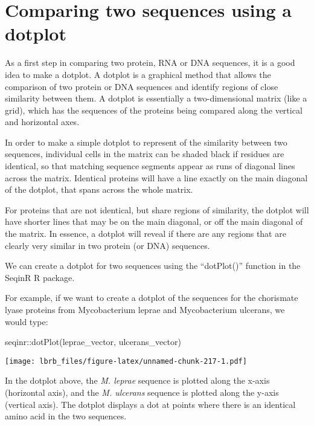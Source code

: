 \documentclass[
]{book}
\newenvironment{Shaded}{\begin{snugshade}}{\end{snugshade}}
\newcommand{\FunctionTok}[1]{\textcolor[rgb]{0.00,0.00,0.00}{#1}}
\newcommand{\NormalTok}[1]{#1}
\newcommand{\SpecialCharTok}[1]{\textcolor[rgb]{0.00,0.00,0.00}{#1}}
\begin{document}
\hypertarget{comparing-two-sequences-using-a-dotplot}{%
\section{Comparing two sequences using a dotplot}\label{comparing-two-sequences-using-a-dotplot}}

As a first step in comparing two protein, RNA or DNA sequences, it is a good idea to make a dotplot. A dotplot is a graphical method that allows the comparison of two protein or DNA sequences and identify regions of close similarity between them. A dotplot is essentially a two-dimensional matrix (like a grid), which has the sequences of the proteins being compared along the vertical and horizontal axes.

In order to make a simple dotplot to represent of the similarity between two sequences, individual cells in the matrix can be shaded black if residues are identical, so that matching sequence segments appear as runs of diagonal lines across the matrix. Identical proteins will have a line exactly on the main diagonal of the dotplot, that spans across the whole matrix.

For proteins that are not identical, but share regions of similarity, the dotplot will have shorter lines that may be on the main diagonal, or off the main diagonal of the matrix. In essence, a dotplot will reveal if there are any regions that are clearly very similar in two protein (or DNA) sequences.

We can create a dotplot for two sequences using the ``dotPlot()'' function in the SeqinR R package.

For example, if we want to create a dotplot of the sequences for the chorismate lyase proteins from Mycobacterium leprae and Mycobacterium ulcerans, we would type:

\begin{Shaded}
\begin{Highlighting}[]
\NormalTok{seqinr}\SpecialCharTok{::}\FunctionTok{dotPlot}\NormalTok{(leprae\_vector, ulcerans\_vector)}
\end{Highlighting}
\end{Shaded}

\texttt{[image: lbrb\_files/figure-latex/unnamed-chunk-217-1.pdf]}

In the dotplot above, the \emph{M. leprae} sequence is plotted along the x-axis (horizontal axis), and the \emph{M. ulcerans} sequence is plotted along the y-axis (vertical axis). The dotplot displays a dot at points where there is an identical amino acid in the two sequences.
\end{document}
